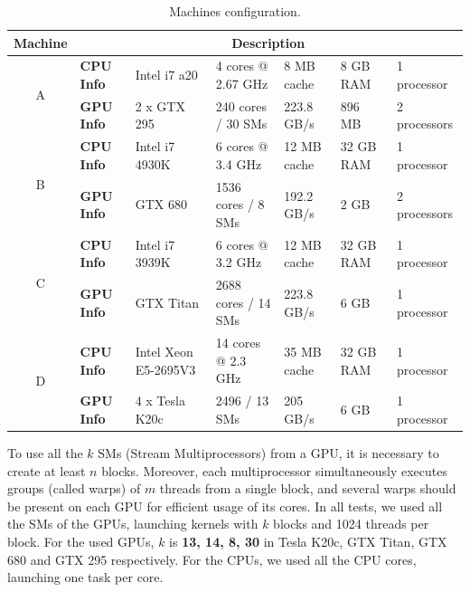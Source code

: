 \documentclass[journal]{IEEEtran}
\begin{document}
\begin{table}[t]
\begin{scriptsize}
\caption{Machines configuration.\label{table:machines}}
\begin{center}

\begin{tabular}{|c|l|l|l|l|l|l|} \hline
\multicolumn{1}{|l|}{Machine} & \multicolumn{6}{|c|}{\textbf{Description}}                                                           \\ \hline
\multirow{2}{*}{A}          & \textbf{CPU Info} & Intel i7 a20   & 4 cores  @ 2.67 GHz  &   8 MB cache   & 8 GB RAM   & 1 processor  \\ \cline{2-7}
                            & \textbf{GPU Info} & 2 x GTX 295    & 240 cores / 30 SMs      & 223.8 GB/s  & 896 MB          & 2 processors \\ \hline
\multirow{2}{*}{B}          & \textbf{CPU Info} & Intel i7 4930K & 6 cores    @ 3.4 GHz & 12 MB cache       & 32 GB RAM        & 1 processor  \\  \cline{2-7}
                            & \textbf{GPU Info} & GTX 680        & 1536 cores / 8 SMs & 192.2 GB/s  & 2 GB       & 2 processors \\ \hline
\multirow{2}{*}{C}          & \textbf{CPU Info} & Intel i7 3939K & 6 cores    @ 3.2 GHz & 12 MB cache & 32 GB RAM            & 1 processor  \\  \cline{2-7}
                            & \textbf{GPU Info} & GTX Titan      & 2688 cores / 14 SMs & 223.8 GB/s  & 6 GB       & 1 processor  \\ \hline
\multirow{2}{*}{D}          & \textbf{CPU Info} & Intel Xeon E5-2695V3 & 14 cores   @ 2.3 GHz &            35 MB cache           & 32 GB RAM            & 1 processor  \\  \cline{2-7}
                            & \textbf{GPU Info} & 4 x Tesla K20c & 2496 / 13 SMs       & 205 GB/s     & 6 GB                      & 1 processor           \\ \hline 
\end{tabular}
\end{center}

\end{scriptsize}
\end{table}



To use all the $k$ SMs (Stream Multiprocessors) from a GPU, it is necessary to
create at least $n$ blocks. Moreover, each multiprocessor simultaneously
executes groups (called warps) of $m$ threads from a single block, and several
warps should be present on each GPU for efficient usage of its cores. In all
tests, we used all the SMs of the GPUs, launching kernels with $k$ blocks and
1024 threads per block. For the used GPUs, $k$ is \textbf{13, 14, 8, 30} in
Tesla K20c, GTX Titan, GTX 680 and GTX 295 respectively. For the CPUs, we used
all the CPU cores, launching one task per core.
\end{document}
